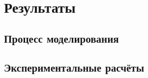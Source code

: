 \section{Результаты}
\subsection{Процесс моделирования}
\subsection{Экспериментальные расчёты}
\begin{figure}[h]
\end{figure}
\begin{figure}[h]
\end{figure}
